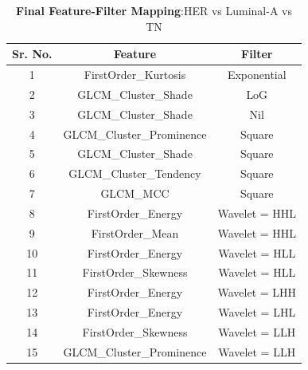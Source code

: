\documentclass[10pt,final,1p,times,twocolumn]{elsarticle}
\begin{document}
\begin{table}[!b]
\centering
\caption{\textbf{Final Feature-Filter Mapping}:HER vs Luminal-A vs TN}
\label{tb2}
\begin{tabular}{| c | c | c |}
\hline
\textbf{Sr. No.} & \textbf{Feature} & \textbf{Filter}\\
\hline
1& FirstOrder\_Kurtosis & Exponential\\
\hline
2& GLCM\_Cluster\_Shade & LoG\\
\hline
3& GLCM\_Cluster\_Shade & Nil \\
\hline
4& GLCM\_Cluster\_Prominence & Square\\
\hline
5& GLCM\_Cluster\_Shade & Square \\
\hline
6& GLCM\_Cluster\_Tendency & Square\\
\hline
7& GLCM\_MCC & Square\\
\hline
8& FirstOrder\_Energy & Wavelet = HHL\\
\hline
9& FirstOrder\_Mean & Wavelet = HHL\\
\hline
10& FirstOrder\_Energy & Wavelet = HLL\\
\hline
11& FirstOrder\_Skewness & Wavelet = HLL\\
\hline
12& FirstOrder\_Energy & Wavelet = LHH\\
\hline
13& FirstOrder\_Energy & Wavelet = LHL\\
\hline
14& FirstOrder\_Skewness & Wavelet = LLH\\
\hline
15& GLCM\_Cluster\_Prominence & Wavelet = LLH\\
\hline
\end{tabular}
\label{tab2}
\end{table}
\end{document}
